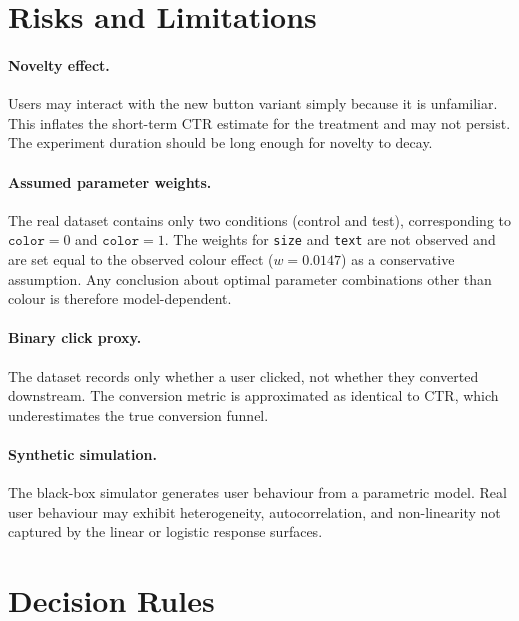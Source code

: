 \documentclass[a4paper,12pt]{extarticle}
\numberwithin{equation}{section}
\begin{document}
\section{Risks and Limitations}

\paragraph{Novelty effect.} Users may interact with the new
button variant simply because it is unfamiliar. This inflates
the short-term CTR estimate for the treatment and may not
persist. The experiment duration should be long enough for
novelty to decay.

\paragraph{Assumed parameter weights.} The real dataset
contains only two conditions (control and test), corresponding
to $\texttt{color} = 0$ and $\texttt{color} = 1$. The weights
for \texttt{size} and \texttt{text} are not observed and are
set equal to the observed colour effect ($w = 0.0147$) as a
conservative assumption. Any conclusion about optimal parameter
combinations other than colour is therefore model-dependent.

\paragraph{Binary click proxy.} The dataset records only
whether a user clicked, not whether they converted downstream.
The conversion metric is approximated as identical to CTR,
which underestimates the true conversion funnel.

\paragraph{Synthetic simulation.} The black-box simulator
generates user behaviour from a parametric model. Real user
behaviour may exhibit heterogeneity, autocorrelation, and
non-linearity not captured by the linear or logistic response
surfaces.

\section{Decision Rules}
\end{document}
